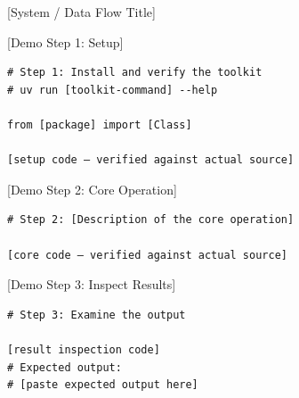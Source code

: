 \documentclass[aspectratio=169]{beamer}
\begin{document}
\begin{frame}{[System / Data Flow Title]}
  \begin{center}
  \end{center}
\end{frame}

\begin{frame}[fragile]{[Demo Step 1: Setup]}
  \begin{lstlisting}[style=nexuspython]
# Step 1: Install and verify the toolkit
# uv run [toolkit-command] --help

from [package] import [Class]

[setup code — verified against actual source]
  \end{lstlisting}
\end{frame}

\begin{frame}[fragile]{[Demo Step 2: Core Operation]}
  \begin{lstlisting}[style=nexuspython]
# Step 2: [Description of the core operation]

[core code — verified against actual source]
  \end{lstlisting}
\end{frame}

\begin{frame}[fragile]{[Demo Step 3: Inspect Results]}
  \begin{lstlisting}[style=nexuspython]
# Step 3: Examine the output

[result inspection code]
# Expected output:
# [paste expected output here]
  \end{lstlisting}
\end{frame}
\end{document}
